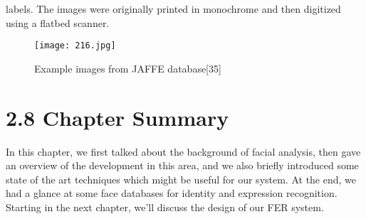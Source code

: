 \documentclass[12pt]{report}
\begin{document}
\newpage
\par

\begin{table}
\caption{Commonly used expression recognition databases [35] }
  \centering
\end{table}

labels. The images were originally printed in monochrome and then digitized using a flatbed scanner.
\begin{figure}
\texttt{[image: 216.jpg]}
\caption{Example images from JAFFE database[35]}
\label{Fig 2.16}
\end{figure}
\section*{2.8 Chapter Summary}
\par
In this chapter, we first talked about the background of facial analysis, then gave an overview of the development in this area, and we also briefly introduced some state of the art techniques which might be useful for our system. At the end, we had a glance at some face databases for identity and expression recognition. Starting in the next chapter, we'll discuss the design of our FER system.
\end{document}

